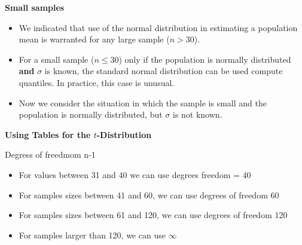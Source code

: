 \documentclass[]{report}
\begin{document}

\textbf{Small samples}
\begin{itemize} \item We indicated that use of the normal distribution in estimating a population mean is warranted
for any large sample ($n > 30$). \item For a small sample ($n \leq 30$) only if the population is normally distributed
\textbf{and} $\sigma$ is known, the standard normal distribution can be used compute quantiles. In practice,
this case is unusual.
\item Now we consider the situation in which the sample is small and the population is normally distributed,
but $\sigma$ is not known.
\end{itemize}

\begin{framed}
\noindent \textbf{Using Tables for the $t$-Distribution}

Degress of freedmom n-1

\begin{itemize}
\item For values between 31 and 40 we can use degrees freedom = 40

\item For samples sizes between 41 and 60, we can use degrees of freedom 60

\item For samples sizes between 61 and 120, we can use degrees of freedom 120

\item For samples larger than 120, we can use $\infty$
\end{itemize}

\end{framed}
\end{document}

